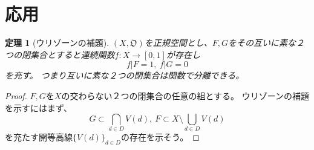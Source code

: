 \documentclass[leqno]{jsarticle}
\newtheorem{thm}{定理}
\begin{document}
\section{応用}

\begin{thm}[ウリゾーンの補題]
$(X,\mathfrak{O})$を正規空間とし、$F,G$をその互いに素な２つの閉集合とすると連続関数$f:X\rightarrow [0,1]$が存在し
\[
f|F=1,\ f|G=0
\]
を充す。
つまり互いに素な２つの閉集合は関数で分離できる。
\end{thm}
\begin{proof}
$F,G$を$X$の交わらない２つの閉集合の任意の組とする。
ウリゾーンの補題を示すにはまず、
\[
G\subset \bigcap_{d\in D}V(d),\ F\subset X\setminus \bigcup_{d\in D}V(d)
\]
を充たす開等高線$\{V(d)\}_{d\in D}$の存在を示そう。\par


\end{proof}
\end{document}
